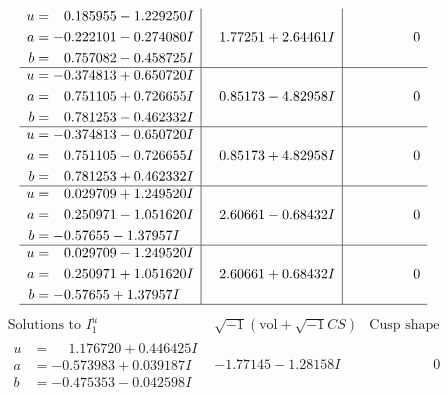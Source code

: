 \documentclass[1p]{elsarticle_modified}
\theoremstyle{definition}
\newcommand{\I}{\sqrt{-1}}
\begin{document}
$$\begin{array}{c|c|c}
\begin{aligned}
u &= \phantom{-}0.185955 - 1.229250 I \\
a &= -0.222101 - 0.274080 I \\
b &= \phantom{-}0.757082 - 0.458725 I\end{aligned}
 & \phantom{-}1.77251 + 2.64461 I & \phantom{-0.000000 } 0 \\ \hline\begin{aligned}
u &= -0.374813 + 0.650720 I \\
a &= \phantom{-}0.751105 + 0.726655 I \\
b &= \phantom{-}0.781253 - 0.462332 I\end{aligned}
 & \phantom{-}0.85173 - 4.82958 I & \phantom{-0.000000 } 0 \\ \hline\begin{aligned}
u &= -0.374813 - 0.650720 I \\
a &= \phantom{-}0.751105 - 0.726655 I \\
b &= \phantom{-}0.781253 + 0.462332 I\end{aligned}
 & \phantom{-}0.85173 + 4.82958 I & \phantom{-0.000000 } 0 \\ \hline\begin{aligned}
u &= \phantom{-}0.029709 + 1.249520 I \\
a &= \phantom{-}0.250971 - 1.051620 I \\
b &= -0.57655 - 1.37957 I\end{aligned}
 & \phantom{-}2.60661 - 0.68432 I & \phantom{-0.000000 } 0 \\ \hline\begin{aligned}
u &= \phantom{-}0.029709 - 1.249520 I \\
a &= \phantom{-}0.250971 + 1.051620 I \\
b &= -0.57655 + 1.37957 I\end{aligned}
 & \phantom{-}2.60661 + 0.68432 I & \phantom{-0.000000 } 0\\
 \hline 
 \end{array}$$\newpage$$\begin{array}{c|c|c}  
\text{Solutions to }I^u_{1}& \I (\text{vol} + \sqrt{-1}CS) & \text{Cusp shape}\\
 \hline 
\begin{aligned}
u &= \phantom{-}1.176720 + 0.446425 I \\
a &= -0.573983 + 0.039187 I \\
b &= -0.475353 - 0.042598 I\end{aligned}
 & -1.77145 - 1.28158 I & \phantom{-0.000000 } 0 \\ \hline\begin{aligned}

\end{aligned}
\end{array}$$
\end{document}
